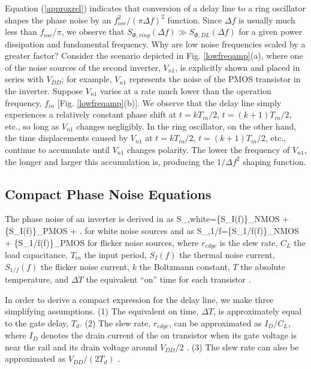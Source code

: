 Equation (\ref{approxrel}) indicates that conversion of a delay line to a ring oscillator shapes the phase noise by an $f_{osc}^2/(\pi \Delta f)^2$ function. 
Since $\Delta f$ is usually much less than $f_{osc}/\pi$, we observe that $S_{\Phi,ring}(\Delta f) \gg S_{\Phi,DL}(\Delta f)$
for a given power dissipation and fundamental frequency.
Why are low
noise frequencies scaled by a greater factor? 
Consider the scenario depicted in Fig. \ref{lowfreqamp}(a), where one of the noise sources of the second inverter, $V_{n1}$, is
explicitly shown and placed in series with $V_{DD}$; for example, $V_{n1}$ represents the noise of the PMOS transistor in the inverter. Suppose $V_{n1}$ varies at a
rate much lower than the operation frequency, $f_{in}$ [Fig. \ref{lowfreqamp}(b)]. We observe that the delay line simply experiences a relatively constant phase shift at $t=kT_{in}/2$,
$t=(k+1)T_{in}/2$, etc., so long as $V_{n1}$ changes negligibly. In the ring oscillator, on the other hand, the time displacements caused by $V_{n1}$ at
$t=kT_{in}/2$, $t=(k+1)T_{in}/2$, etc., continue to accumulate until $V_{n1}$ changes polarity. The lower the frequency of $V_{n1}$, the longer and larger this
accumulation is, producing the $1/\Delta f^2$ shaping function.



\subsection{Compact Phase Noise Equations}

The phase noise of an
inverter is derived in \cite{Homayoun} as
\beq
S_{\Phi,white}=\left\{S_{I}(f)\right\}_{NMOS} + \left\{S_{I}(f)\right\}_{PMOS} + .
\label{sphiwinverter}
\eeq
for white noise sources and as 
\beq
S_{\Phi,1/f}=\left\{S_{1/f}(f)\right\}_{NMOS} + \left\{S_{1/f}(f)\right\}_{PMOS}
\label{sphi1/finverter}
\eeq
for flicker noise sources, where $r_{edge}$ is the slew rate, $C_L$ the load capacitance, $T_{in}$ the input period, $S_I(f)$ the thermal noise
current, $S_{1/f}(f)$ the flicker noise current, $k$ the Boltzmann constant, $T$ the absolute temperature, and $\Delta T$ the equivalent ``on'' time for each
transistor \cite{Homayoun}.

In order to derive a compact expression for the delay line, we make three simplifying assumptions. 
(1) The equivalent on time, $\Delta T$, is approximately equal to the gate delay, $T_d$.
(2) The slew rate, $r_{edge}$, can be approximated as $I_D/C_L$, where $I_D$ denotes the drain current of the on transistor when its 
gate voltage is near the rail and its drain voltage around $V_{DD}/2$ \cite{Homayoun}.
(3) The slew rate can also be approximated as $V_{DD}/(2 T_d)$ \cite{digitalbook}.

